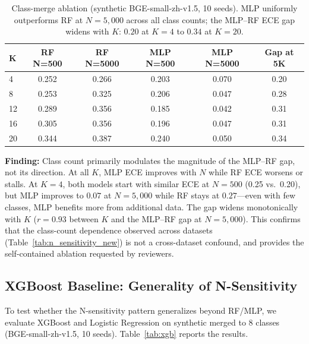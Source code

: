 \documentclass[11pt]{article}
\begin{document}
\begin{table}[t]
\centering
\caption{Class-merge ablation (synthetic BGE-small-zh-v1.5, 10 seeds). MLP uniformly outperforms RF at $N{=}5{,}000$ across all class counts; the MLP--RF ECE gap widens with $K$: $0.20$ at $K{=}4$ to $0.34$ at $K{=}20$.}
\label{tab:class_merge}
\begin{tabular}{@{}lccccc@{}}
\toprule
$\boldsymbol{K}$ & \textbf{RF N=500} & \textbf{RF N=5000} & \textbf{MLP N=500} & \textbf{MLP N=5000} & \textbf{Gap at 5K} \\
\midrule
4  & 0.252 & 0.266 & 0.203 & 0.070 & 0.20 \\
8  & 0.253 & 0.325 & 0.206 & 0.047 & 0.28 \\
12 & 0.289 & 0.356 & 0.185 & 0.042 & 0.31 \\
16 & 0.305 & 0.356 & 0.196 & 0.047 & 0.31 \\
20 & 0.344 & 0.387 & 0.240 & 0.050 & 0.34 \\
\bottomrule
\end{tabular}
\end{table}

\textbf{Finding:} Class count primarily modulates the magnitude of the MLP--RF gap, not its direction. At all $K$, MLP ECE improves with $N$ while RF ECE worsens or stalls. At $K{=}4$, both models start with similar ECE at $N{=}500$ (0.25 vs.\ 0.20), but MLP improves to $0.07$ at $N{=}5{,}000$ while RF stays at $0.27$---even with few classes, MLP benefits more from additional data. The gap widens monotonically with $K$ ($r{=}0.93$ between $K$ and the MLP--RF gap at $N{=}5{,}000$). This confirms that the class-count dependence observed across datasets (Table~\ref{tab:n_sensitivity_new}) is not a cross-dataset confound, and provides the self-contained ablation requested by reviewers.

\subsection{XGBoost Baseline: Generality of N-Sensitivity}

To test whether the N-sensitivity pattern generalizes beyond RF/MLP, we evaluate XGBoost and Logistic Regression on synthetic merged to 8 classes (BGE-small-zh-v1.5, 10 seeds). Table~\ref{tab:xgb} reports the results.
\end{document}

